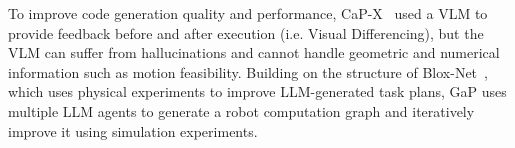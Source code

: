 To improve code generation quality and performance, CaP-X~\cite{fu2026cap} used a VLM to provide feedback before and after execution (i.e. Visual Differencing), but the VLM can suffer from hallucinations and cannot handle geometric and numerical information such as motion feasibility. 
Building on the structure of Blox-Net~\cite{goldberg2025bloxnet}, which uses physical experiments to improve LLM-generated task plans, GaP uses multiple LLM agents to generate a robot computation graph and iteratively improve it using simulation experiments.
